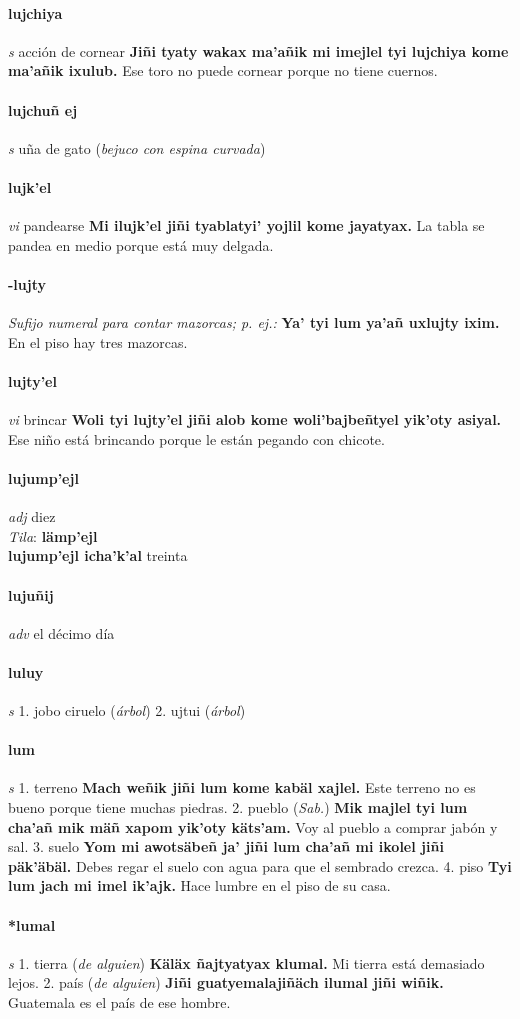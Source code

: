 \documentclass{scrbook}
\newcommand{\entry}[1]{\paragraph{#1}}
\newcommand{\onedefinition}[1]{#1.}
\newcommand{\nontranslationdef}[1]{\textit{#1}}
\newcommand{\partofspeech}[1]{\textit{#1}}
\newcommand{\spanishtranslation}[1]{#1}
\newcommand{\clarification}[1]{(\textit{#1})}
\newcommand{\cholexample}[1]{\textbf{#1}}
\newcommand{\exampletranslation}[1]{#1}
\newcommand{\dialectvariant}[1]{\\\textit{#1}:}
\newcommand{\dialectword}[1]{\textbf{#1}}
\newcommand{\relevantdialect}[1]{(\textit{#1})}
\newcommand{\secondaryentry}[1]{\\\textbf{#1}}
\newcommand{\secondtranslation}[1]{#1}
\begin{document}
\begin{multicols}{2}
\entry{lujchiya}
\partofspeech{s}
\spanishtranslation{acción de cornear}
\cholexample{Jiñi tyaty wakax ma'añik mi imejlel tyi lujchiya kome ma'añik ixulub.}
\exampletranslation{Ese toro no puede cornear porque no tiene cuernos.}

\entry{lujchuñ ej}
\partofspeech{s}
\spanishtranslation{uña de gato}
\clarification{bejuco con espina curvada}

\entry{lujk'el}
\partofspeech{vi}
\spanishtranslation{pandearse}
\cholexample{Mi ilujk'el jiñi tyablatyi' yojlil kome jayatyax.}
\exampletranslation{La tabla se pandea en medio porque está muy delgada.}

\entry{-lujty}
\nontranslationdef{Sufijo numeral para contar mazorcas; p. ej.:}
\cholexample{Ya' tyi lum ya'añ uxlujty ixim.}
\exampletranslation{En el piso hay tres mazorcas.}

\entry{lujty'el}
\partofspeech{vi}
\spanishtranslation{brincar}
\cholexample{Woli tyi lujty'el jiñi alob kome woli'bajbeñtyel yik'oty asiyal.}
\exampletranslation{Ese niño está brincando porque le están pegando con chicote.}

\entry{lujump'ejl}
\partofspeech{adj}
\spanishtranslation{diez}
\dialectvariant{Tila}
\dialectword{lämp'ejl}
\secondaryentry{lujump'ejl icha'k'al}
\secondtranslation{treinta}

\entry{lujuñij}
\partofspeech{adv}
\spanishtranslation{el décimo día}

\entry{luluy}
\partofspeech{s}
\onedefinition{1}
\spanishtranslation{jobo}
\spanishtranslation{ciruelo}
\clarification{árbol}
\onedefinition{2}
\spanishtranslation{ujtui}
\clarification{árbol}

\entry{lum}
\partofspeech{s}
\onedefinition{1}
\spanishtranslation{terreno}
\cholexample{Mach weñik jiñi lum kome kabäl xajlel.}
\exampletranslation{Este terreno no es bueno porque tiene muchas piedras.}
\onedefinition{2}
\spanishtranslation{pueblo}
\relevantdialect{Sab.}
\cholexample{Mik majlel tyi lum cha'añ mik mäñ xapom yik'oty käts'am.}
\exampletranslation{Voy al pueblo a comprar jabón y sal.}
\onedefinition{3}
\spanishtranslation{suelo}
\cholexample{Yom mi awotsäbeñ ja' jiñi lum cha'añ mi ikolel jiñi päk'äbäl.}
\exampletranslation{Debes regar el suelo con agua para que el sembrado crezca.}
\onedefinition{4}
\spanishtranslation{piso}
\cholexample{Tyi lum jach mi imel ik'ajk.}
\exampletranslation{Hace lumbre en el piso de su casa.}

\entry{*lumal}
\partofspeech{s}
\onedefinition{1}
\spanishtranslation{tierra}
\clarification{de alguien}
\cholexample{Käläx ñajtyatyax klumal.}
\exampletranslation{Mi tierra está demasiado lejos.}
\onedefinition{2}
\spanishtranslation{país}
\clarification{de alguien}
\cholexample{Jiñi guatyemalajiñäch ilumal jiñi wiñik.}
\exampletranslation{Guatemala es el país de ese hombre.}


\end{multicols}
\end{document}

